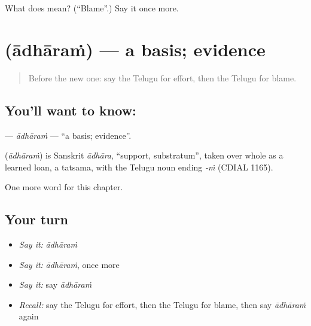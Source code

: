 \begin{tcolorbox}[breakable,colback=teal!4,colframe=teal!35!black,title={Before you move on}]
What does  mean? (\textquotedblleft{}Blame\textquotedblright{}.) Say it once more.
\end{tcolorbox}
\section[\texorpdfstring{\te{ఆధారం} (ādhāraṁ)}{ఆధారం (ādhāraṁ)}]{ (ādhāraṁ) — a basis; evidence}

\label{lesson:TE-C219-adharam}



\begin{quote}
Before the new one: say the Telugu for effort, then the Telugu for blame.
\end{quote}

\subsection*{You'll want to know: }
\textbf{} — \emph{ādhāraṁ} — \textquotedblleft{}a basis; evidence\textquotedblright{}.

\begin{cousinweb}
\textbf{} (\emph{ādhāraṁ}) is Sanskrit \emph{ādhāra}, \textquotedblleft{}support, substratum\textquotedblright{}, taken over whole as a learned loan, a tatsama, with the Telugu noun ending \emph{-ṁ} (CDIAL 1165).
\end{cousinweb}

\begin{grammarlens}[title={What you've built}]
One more word for this chapter.
\end{grammarlens}

\subsection*{Your turn}
\begin{itemize}
\raggedright
  \item \emph{Say it:} \emph{ādhāraṁ}
  \item \emph{Say it:} \emph{ādhāraṁ}, once more
  \item \emph{Say it:} say \emph{ādhāraṁ}
  \item \emph{Recall:} say the Telugu for effort, then the Telugu for blame, then say \emph{ādhāraṁ} again
\end{itemize}

